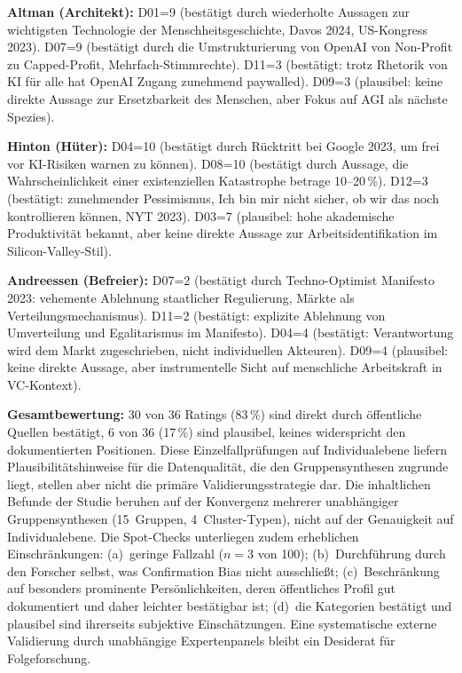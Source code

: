 \documentclass[12pt,a4paper]{article}
\begin{document}
\textbf{Altman (Architekt):} D01=9 (best\"atigt durch wiederholte Aussagen zur \glqq wichtigsten Technologie der Menschheitsgeschichte\grqq, Davos 2024, US-Kongress 2023). D07=9 (best\"atigt durch die Umstrukturierung von OpenAI von Non-Profit zu Capped-Profit, Mehrfach-Stimmrechte). D11=3 (best\"atigt: trotz Rhetorik von \glqq KI f\"ur alle\grqq{} hat OpenAI Zugang zunehmend paywalled). D09=3 (plausibel: keine direkte Aussage zur Ersetzbarkeit des Menschen, aber Fokus auf AGI als \glqq n\"achste Spezies\grqq).

\textbf{Hinton (H\"uter):} D04=10 (best\"atigt durch R\"ucktritt bei Google 2023, um frei vor KI-Risiken warnen zu k\"onnen). D08=10 (best\"atigt durch Aussage, die Wahrscheinlichkeit einer existenziellen Katastrophe betrage 10--20\,\%). D12=3 (best\"atigt: zunehmender Pessimismus, \glqq Ich bin mir nicht sicher, ob wir das noch kontrollieren k\"onnen\grqq, NYT 2023). D03=7 (plausibel: hohe akademische Produktivit\"at bekannt, aber keine direkte Aussage zur Arbeitsidentifikation im Silicon-Valley-Stil).

\textbf{Andreessen (Befreier):} D07=2 (best\"atigt durch \glqq Techno-Optimist Manifesto\grqq{} 2023: vehemente Ablehnung staatlicher Regulierung, M\"arkte als Verteilungsmechanismus). D11=2 (best\"atigt: explizite Ablehnung von Umverteilung und Egalitarismus im Manifesto). D04=4 (best\"atigt: Verantwortung wird dem Markt zugeschrieben, nicht individuellen Akteuren). D09=4 (plausibel: keine direkte Aussage, aber instrumentelle Sicht auf menschliche Arbeitskraft in VC-Kontext).

\textbf{Gesamtbewertung:} 30 von 36 Ratings (83\,\%) sind direkt durch \"offentliche Quellen best\"atigt, 6 von 36 (17\,\%) sind plausibel, keines widerspricht den dokumentierten Positionen. Diese Einzelfallpr\"ufungen auf Individualebene liefern Plausibilit\"atshinweise f\"ur die Datenqualit\"at, die den Gruppensynthesen zugrunde liegt, stellen aber nicht die prim\"are Validierungsstrategie dar. Die inhaltlichen Befunde der Studie beruhen auf der Konvergenz mehrerer unabh\"angiger Gruppensynthesen (15~Gruppen, 4~Cluster-Typen), nicht auf der Genauigkeit auf Individualebene. Die Spot-Checks unterliegen zudem erheblichen Einschr\"ankungen: (a)~geringe Fallzahl ($n=3$ von 100); (b)~Durchf\"uhrung durch den Forscher selbst, was Confirmation Bias nicht ausschlie\ss{}t; (c)~Beschr\"ankung auf besonders prominente Pers\"onlichkeiten, deren \"offentliches Profil gut dokumentiert und daher leichter \glqq best\"atigbar\grqq{} ist; (d)~die Kategorien \glqq best\"atigt\grqq{} und \glqq plausibel\grqq{} sind ihrerseits subjektive Einsch\"atzungen. Eine systematische externe Validierung durch unabh\"angige Expertenpanels bleibt ein Desiderat f\"ur Folgeforschung.
\end{document}
